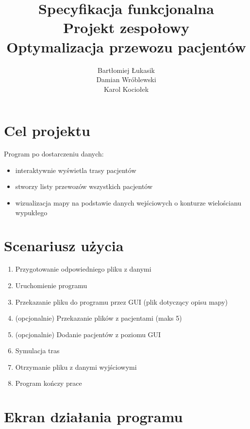 \documentclass[]{article}
\title{Specyfikacja funkcjonalna\\Projekt zespołowy\\Optymalizacja przewozu pacjentów}
\author{Bartłomiej Łukasik\\Damian Wróblewski\\Karol Kociołek}
\begin{document}
\maketitle

\section{Cel projektu}
Program po dostarczeniu danych:
\begin{itemize}
\item interaktywnie wyświetla trasy pacjentów
\item stworzy listy przewozów wszystkich pacjentów
\item wizualizacja mapy na podstawie danych wejściowych o konturze wielościanu wypukłego 
\end {itemize}


\section{Scenariusz użycia}
\begin {enumerate}
\item Przygotowanie odpowiedniego pliku z danymi
\item Uruchomienie programu
\item Przekazanie pliku do programu przez GUI (plik dotyczący opisu mapy)
\item (opcjonalnie) Przekazanie plików z pacjentami (maks 5)
\item (opcjonalnie) Dodanie pacjentów z poziomu GUI
\item Symulacja tras
\item Otrzymanie pliku z danymi wyjściowymi
\item Program kończy prace\\
\end {enumerate}
\clearpage

\section{Ekran działania programu}

\begin{figure}[!htb]
\end{figure}
\end{document}
